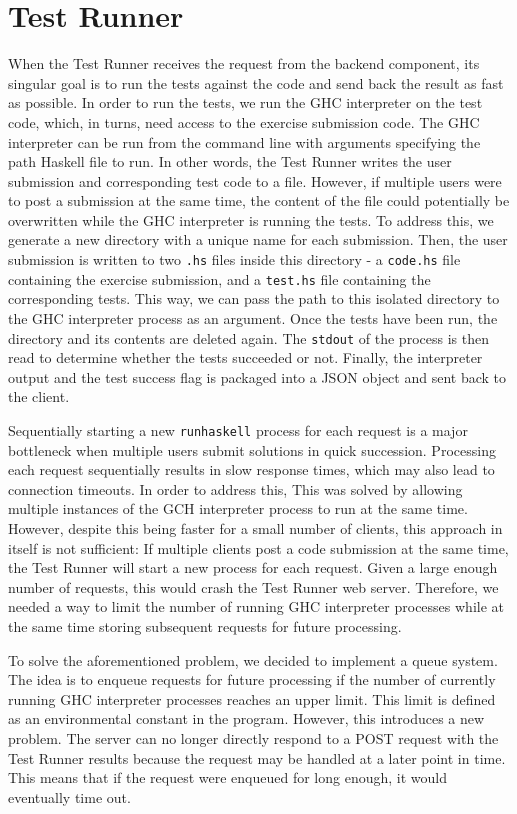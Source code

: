 \chapter{Test Runner} \label{chap:TestRunner}
When the Test Runner receives the request from the backend component, its singular goal is to run the tests against the code and send back the result as fast as possible.
In order to run the tests, we run the GHC interpreter on the test code, which, in turns, need access to the exercise submission code.
The GHC interpreter can be run from the command line with arguments specifying the path Haskell file to run.
In other words, the Test Runner writes the user submission and corresponding test code to a file.
However, if multiple users were to post a submission at the same time, the content of the file could potentially be overwritten while the GHC interpreter is running the tests.
To address this, we generate a new directory with a unique name for each submission.
Then, the user submission is written to two  \texttt{.hs} files inside this directory - a \texttt{code.hs} file containing the exercise submission, and a \texttt{test.hs} file containing the corresponding tests.
This way, we can pass the path to this isolated directory to the GHC interpreter process as an argument.
Once the tests have been run, the directory and its contents are deleted again.
The \texttt{stdout} of the process is then read to determine whether the tests succeeded or not.
Finally, the interpreter output and the test success flag is packaged into a JSON object and sent back to the client.

Sequentially starting a new \texttt{runhaskell} process for each request is a major bottleneck when multiple users submit solutions in quick succession.
Processing each request sequentially results in slow response times, which may also lead to connection timeouts.
In order to address this,
This was solved by allowing multiple instances of the GCH interpreter process to run at the same time.
However, despite this being faster for a small number of clients, this approach in itself is not sufficient:
If multiple clients post a code submission at the same time, the Test Runner will start a new process for each request.
Given a large enough number of requests, this would crash the Test Runner web server.
Therefore, we needed a way to limit the number of running GHC interpreter processes while at the same time storing subsequent requests for future processing.

To solve the aforementioned problem, we decided to implement a queue system.
The idea is to enqueue requests for future processing if the number of currently running GHC interpreter processes reaches an upper limit.
This limit is defined as an environmental constant in the program.
However, this introduces a new problem.
The server can no longer directly respond to a POST request with the Test Runner results because the request may be handled at a later point in time.
This means that if the request were enqueued for long enough, it would eventually time out.



